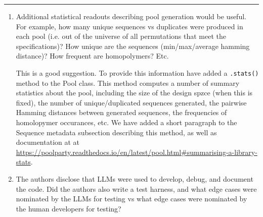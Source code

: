 \documentclass[11pt]{article}
\newenvironment{response}{\par\color{responseblue}}{\par}
\newenvironment{msquote}
  {\begin{quote}\color{responseblue}\itshape\noindent\ignorespaces}
  {\end{quote}}
\newcommand{\reviewersection}[1]{%
  \bigskip\par\noindent{\large\bfseries #1}\par\medskip\hrule\medskip}
\begin{document}
\reviewersection{Reviewer 2}

\begin{enumerate}
\item Additional statistical readouts describing pool generation would be
useful. For example, how many unique sequences vs duplicates were produced in
each pool (i.e. out of the universe of all permutations that meet the
specifications)? How unique are the sequences (min/max/average hamming distance)?
How frequent are homopolymers? Etc.

\begin{response}
This is a good suggestion. To provide this information have added a \texttt{.stats()} method to the Pool class. This method computes a number of summary statistics about the pool, including the size of the design spzce (when this is fixed), the number of unique/duplicated sequences generated, the pairwise Hamming distances between generated sequences, the frequencies of homolopymer occurances, etc. We have added a short paragraph to the Sequence metadata subsection describing this method, as well as documentation at  at \url{https://poolparty.readthedocs.io/en/latest/pool.html#summarising-a-library-stats}. 
\end{response}



\item The authors disclose that LLMs were used to develop, debug, and document the code. Did the authors also write a test harness, and what edge cases were nominated by the LLMs for testing vs what edge cases were nominated by the human developers for testing?


\end{enumerate}
\end{document}
